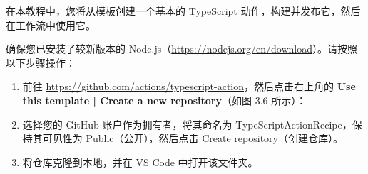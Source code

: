 
在本教程中，您将从模板创建一个基本的 TypeScript 动作，构建并发布它，然后在工作流中使用它。


确保您已安装了较新版本的 Node.js（\url{https://nodejs.org/en/download}）。请按照以下步骤操作：

\begin{enumerate}
\item 
前往 \url{https://github.com/actions/typescript-action}，然后点击右上角的 \textbf{Use this template | Create a new repository}（如图 3.6 所示）：


\item 
选择您的 GitHub 账户作为拥有者，将其命名为 TypeScriptActionRecipe，保持其可见性为 Public（公开），然后点击 Create repository（创建仓库）。

\item 
将仓库克隆到本地，并在 VS Code 中打开该文件夹。
\end{enumerate}


